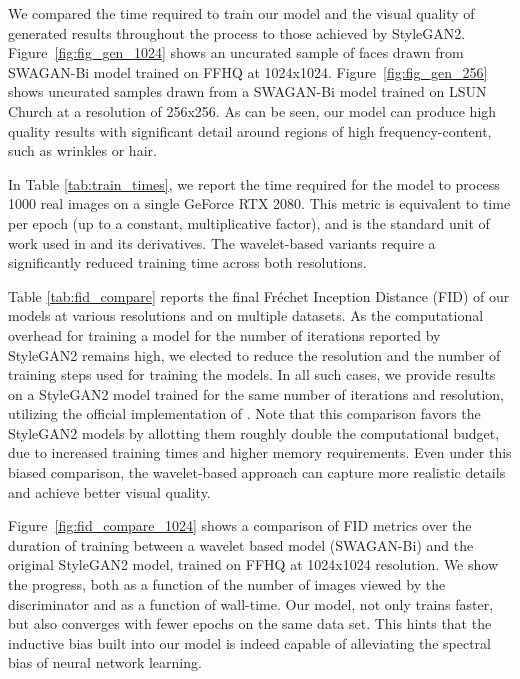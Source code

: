 \documentclass[final]{CVPR2021/cvpr}
\begin{document}
We compared the time required to train our model and the visual quality of generated results throughout the process to those achieved by StyleGAN2. Figure~\ref{fig:fig_gen_1024} shows an uncurated sample of faces drawn from SWAGAN-Bi model trained on FFHQ at 1024x1024.
Figure~\ref{fig:fig_gen_256} shows uncurated samples drawn from a SWAGAN-Bi model trained on LSUN Church at a resolution of 256x256. As can be seen, our model can produce high quality results with significant detail around regions of high frequency-content, such as wrinkles or hair.

In Table \ref{tab:train_times}, we report the time required for the model to process 1000 real images on a single GeForce RTX 2080. This metric is equivalent to time per epoch (up to a \mbox{constant}, multiplicative factor), and is the standard unit of work used in \cite{karras_style-based_2019} and its derivatives. The wavelet-based variants require a significantly reduced training time across both \mbox{resolutions}. 

Table \ref{tab:fid_compare} reports the final Fréchet Inception Distance (FID) of our models at various resolutions and on multiple datasets. As the computational overhead for training a model for the number of iterations reported by StyleGAN2 remains high, we elected to reduce the resolution and the number of training steps used for training the models. In all such cases, we provide results on a StyleGAN2 model trained for the same number of iterations and resolution, utilizing the official implementation of \citet{karras2020analyzing}. Note that this comparison favors the StyleGAN2 models by allotting them roughly double the computational budget, due to increased training times and higher memory requirements. Even under this biased comparison, the wavelet-based approach can capture more realistic details and achieve better visual quality.

Figure~\ref{fig:fid_compare_1024} shows a comparison of FID metrics over the duration of training between a wavelet based model (SWAGAN-Bi) and the original StyleGAN2 model, trained on FFHQ at 1024x1024 resolution. We show the progress, both as a function of the number of images viewed by the discriminator and as a function of wall-time. Our model, not only trains faster, but also converges with fewer epochs on the same data set. This hints that the inductive bias built into our model is indeed capable of alleviating the spectral bias of neural network learning. 
\end{document}
